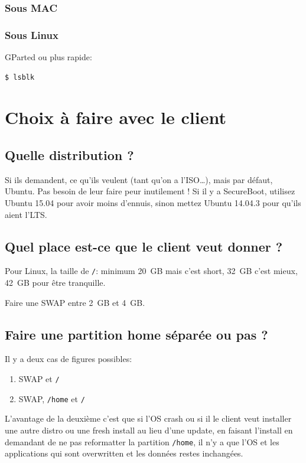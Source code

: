 \documentclass{../guide}
\begin{document}
\subsubsection{Sous MAC}
\subsubsection{Sous Linux}
GParted ou plus rapide:
\begin{verbatim}
$ lsblk
\end{verbatim}

\section{Choix à faire avec le client}

\subsection{Quelle distribution ?}
Si ils demandent, ce qu'ils veulent (tant qu'on a l'ISO…), mais par défaut, Ubuntu. Pas besoin de leur faire peur inutilement !
Si il y a SecureBoot, utilisez Ubuntu 15.04 pour avoir moins d'ennuis, sinon mettez Ubuntu 14.04.3 pour qu'ils aient l'LTS.

\subsection{Quel place est-ce que le client veut donner ?}
Pour Linux, la taille de \verb|/|: minimum \SI{20}{GB} mais c'est short, \SI{32}{GB} c'est mieux, \SI{42}{GB} pour être tranquille.

Faire une SWAP entre \SI{2}{GB} et \SI{4}{\giga B}.

\subsection{Faire une partition home séparée ou pas ?}
Il y a deux cas de figures possibles:
\begin{enumerate}
  \item SWAP et \verb|/|
  \item SWAP, \verb|/home| et \verb|/|
\end{enumerate}

L'avantage de la deuxième c'est que si l'OS crash ou si il le client veut installer une autre distro ou une fresh install au lieu d'une update, en faisant l'install en demandant de ne pas reformatter la partition \verb|/home|, il n'y a que l'OS et les applications qui sont overwritten et les données restes inchangées.
\end{document}
